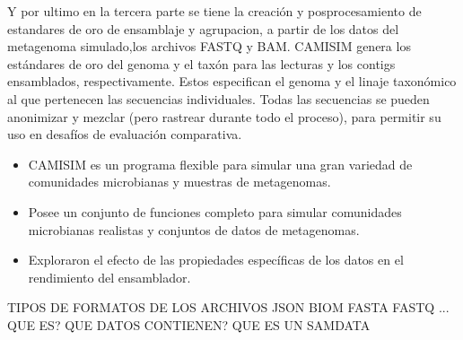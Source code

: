 Y por ultimo en la tercera parte se tiene la creación y posprocesamiento de estandares de oro de ensamblaje y agrupacion, a partir de los datos del metagenoma simulado,los archivos FASTQ y BAM. CAMISIM genera los estándares de oro del genoma y el taxón para las lecturas y los contigs ensamblados, respectivamente. Estos especifican el genoma y el linaje taxonómico al que pertenecen las secuencias individuales. Todas las secuencias se pueden anonimizar y mezclar (pero rastrear durante todo el proceso), para permitir su uso en desafíos de evaluación comparativa.  \\

\begin{itemize}
    \item CAMISIM es un programa flexible para simular una gran variedad de comunidades microbianas y muestras de metagenomas. 
    \item Posee un conjunto de funciones completo para simular comunidades microbianas realistas y conjuntos de datos de metagenomas.
    \item Exploraron el efecto de las propiedades específicas de los datos en el rendimiento del ensamblador.
\end{itemize}

TIPOS DE FORMATOS DE LOS ARCHIVOS
JSON
BIOM
FASTA
FASTQ
...
QUE ES?
QUE DATOS CONTIENEN?
QUE ES UN SAMDATA
